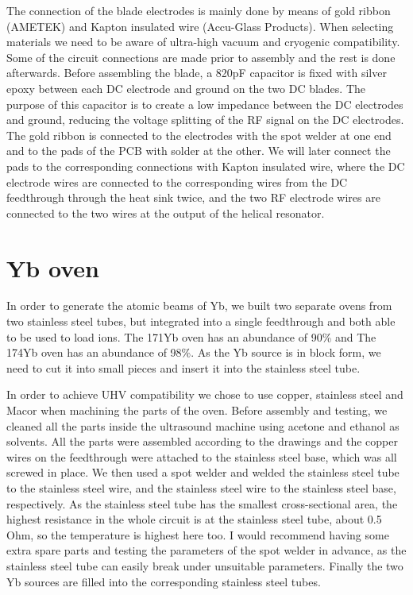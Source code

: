 The connection of the blade electrodes is mainly done by means of gold ribbon (AMETEK) and Kapton insulated wire (Accu-Glass Products). When selecting materials we need to be aware of ultra-high vacuum and cryogenic compatibility. Some of the circuit connections are made prior to assembly and the rest is done afterwards. Before assembling the blade, a 820pF capacitor is fixed with silver epoxy between each DC electrode and ground on the two DC blades. The purpose of this capacitor is to create a low impedance between the DC electrodes and ground, reducing the voltage splitting of the RF signal on the DC electrodes. The gold ribbon is connected to the electrodes with the spot welder at one end and to the pads of the PCB with solder at the other. We will later connect the pads to the corresponding connections with Kapton insulated wire, where the DC electrode wires are connected to the corresponding wires from the DC feedthrough through the heat sink twice, and the two RF electrode wires are connected to the two wires at the output of the helical resonator.



\section{Yb oven}

In order to generate the atomic beams of Yb, we built two separate ovens from two stainless steel tubes, but integrated into a single feedthrough and both able to be used to load ions. The 171Yb oven has an abundance of 90\% and The 174Yb oven has an abundance of 98\%. As the Yb source is in block form, we need to cut it into small pieces and insert it into the stainless steel tube.

In order to achieve UHV compatibility we chose to use copper, stainless steel and Macor when machining the parts of the oven. Before assembly and testing, we cleaned all the parts inside the ultrasound machine using acetone and ethanol as solvents. All the parts were assembled according to the drawings and the copper wires on the feedthrough were attached to the stainless steel base, which was all screwed in place. We then used a spot welder and welded the stainless steel tube to the stainless steel wire, and the stainless steel wire to the stainless steel base, respectively. As the stainless steel tube has the smallest cross-sectional area, the highest resistance in the whole circuit is at the stainless steel tube, about 0.5 Ohm, so the temperature is highest here too. I would recommend having some extra spare parts and testing the parameters of the spot welder in advance, as the stainless steel tube can easily break under unsuitable parameters. Finally the two Yb sources are filled into the corresponding stainless steel tubes.

